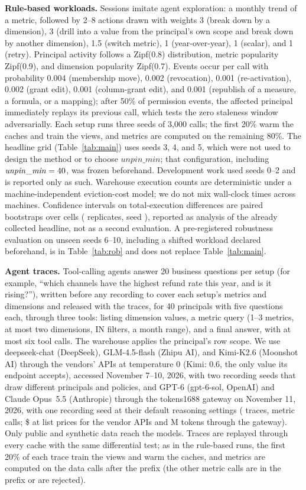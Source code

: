 \documentclass[sigconf, nonacm]{acmart}
\begin{document}
\textbf{Rule-based workloads.} Sessions imitate agent exploration: a monthly trend of a metric, followed by 2--8 actions drawn with weights 3 (break down by a dimension), 3 (drill into a value from the principal's own scope and break down by another dimension), 1.5 (switch metric), 1 (year-over-year), 1 (scalar), and 1 (retry). Principal activity follows a Zipf(0.8) distribution, metric popularity Zipf(0.9), and dimension popularity Zipf(0.7). Events occur per call with probability 0.004 (membership move), 0.002 (revocation), 0.001 (re-activation), 0.002 (grant edit), 0.001 (column-grant edit), and 0.001 (republish of a measure, a formula, or a mapping); after 50\% of permission events, the affected principal immediately replays its previous call, which tests the zero staleness window adversarially. Each setup runs three seeds of 3{,}000 calls; the first 20\% warm the caches and train the views, and metrics are computed on the remaining 80\%. The headline grid (Table~\ref{tab:main}) uses seeds 3, 4, and 5, which were not used to design the method or to choose $\mathit{unpin\_min}$; that configuration, including $\mathit{unpin\_min}=40{}$, was frozen beforehand. Development work used seeds 0--2 and is reported only as such. Warehouse execution counts are deterministic under a machine-independent eviction-cost model; we do not mix wall-clock times across machines. Confidence intervals on total-execution differences are paired bootstraps over cells (\bootB{} replicates, seed \bootSeed{}), reported as analysis of the already collected headline, not as a second evaluation. A pre-registered robustness evaluation on unseen seeds 6--10, including a shifted workload declared beforehand, is in Table~\ref{tab:rob} and does not replace Table~\ref{tab:main}.

\textbf{Agent traces.} Tool-calling agents answer 20 business questions per setup (for example, ``which channels have the highest refund rate this year, and is it rising?''), written before any recording to cover each setup's metrics and dimensions and released with the traces, for 40 principals with five questions each, through three tools: listing dimension values, a metric query (1--3 metrics, at most two dimensions, IN filters, a month range), and a final answer, with at most six tool calls. The warehouse applies the principal's row scope. We use deepseek-chat (DeepSeek), GLM-4.5-flash (Zhipu AI), and Kimi-K2.6 (Moonshot AI) through the vendors' APIs at temperature 0 (Kimi: 0.6, the only value its endpoint accepts), accessed November 7--10, 2026, with two recording seeds that draw different principals and policies, and GPT-6 (gpt-6-sol, OpenAI) and Claude Opus~5.5 (Anthropic) through the tokens1688 gateway on November 11, 2026, with one recording seed at their default reasoning settings (\nAgentTraces{} traces, \nAgentCalls{} metric calls; \$\agentCost{} at list prices for the vendor APIs and \intlMTokens{}M tokens through the gateway). Only public and synthetic data reach the models. Traces are replayed through every cache with the same differential test; as in the rule-based runs, the first 20\% of each trace train the views and warm the caches, and metrics are computed on the \nAgentDataCalls{} data calls after the prefix (the other metric calls are in the prefix or are rejected).
\end{document}
